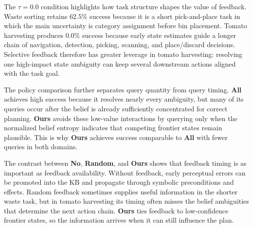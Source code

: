 The $\tau=0.0$ condition highlights how task structure shapes the value of feedback. Waste sorting retains $62.5\%$ success because it is a short pick-and-place task in which the main uncertainty is category assignment before bin placement. Tomato harvesting produces $0.0\%$ success because early state estimates guide a longer chain of navigation, detection, picking, scanning, and place/discard decisions. Selective feedback therefore has greater leverage in tomato harvesting: resolving one high-impact state ambiguity can keep several downstream actions aligned with the task goal.

The policy comparison further separates query quantity from query timing. \textbf{All} achieves high success because it resolves nearly every ambiguity, but many of its queries occur after the belief is already sufficiently concentrated for correct planning. \textbf{Ours} avoids these low-value interactions by querying only when the normalized belief entropy indicates that competing frontier states remain plausible. This is why \textbf{Ours} achieves success comparable to \textbf{All} with fewer queries in both domains.

The contrast between \textbf{No}, \textbf{Random}, and \textbf{Ours} shows that feedback timing is as important as feedback availability. Without feedback, early perceptual errors can be promoted into the KB and propagate through symbolic preconditions and effects. Random feedback sometimes supplies useful information in the shorter waste task, but in tomato harvesting its timing often misses the belief ambiguities that determine the next action chain. \textbf{Ours} ties feedback to low-confidence frontier states, so the information arrives when it can still influence the plan.
